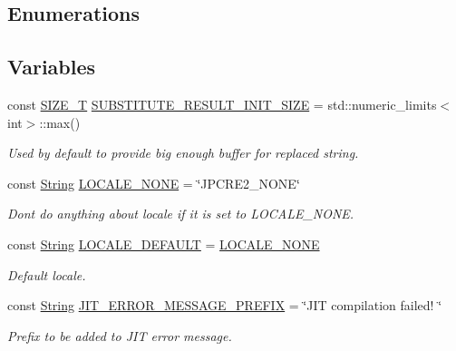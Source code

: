 \subsection*{Enumerations}
\subsection*{Variables}
\begin{DoxyCompactItemize}
\item 
const \hyperlink{namespacejpcre2_a2aac465ddcb123560c7c8215dd69246c}{S\+I\+Z\+E\+\_\+T} \hyperlink{namespacejpcre2_a80cb201f2e733137b22a8ed98465096a}{S\+U\+B\+S\+T\+I\+T\+U\+T\+E\+\_\+\+R\+E\+S\+U\+L\+T\+\_\+\+I\+N\+I\+T\+\_\+\+S\+I\+ZE} = std\+::numeric\+\_\+limits$<$int$>$\+::max()
\begin{DoxyCompactList}\small\item\em Used by default to provide big enough buffer for replaced string. \end{DoxyCompactList}\item 
const \hyperlink{namespacejpcre2_a91f03070152fb228bc116c5a737f1d16}{String} \hyperlink{namespacejpcre2_ad2236dcdcc14d580724b256ce7f168e5}{L\+O\+C\+A\+L\+E\+\_\+\+N\+O\+NE} = \char`\"{}J\+P\+C\+R\+E2\+\_\+\+N\+O\+NE\char`\"{}
\begin{DoxyCompactList}\small\item\em Don\textquotesingle{}t do anything about locale if it is set to L\+O\+C\+A\+L\+E\+\_\+\+N\+O\+NE. \end{DoxyCompactList}\item 
const \hyperlink{namespacejpcre2_a91f03070152fb228bc116c5a737f1d16}{String} \hyperlink{namespacejpcre2_adfdd3d1fff99e685734ae4e59771e84d}{L\+O\+C\+A\+L\+E\+\_\+\+D\+E\+F\+A\+U\+LT} = \hyperlink{namespacejpcre2_ad2236dcdcc14d580724b256ce7f168e5}{L\+O\+C\+A\+L\+E\+\_\+\+N\+O\+NE}
\begin{DoxyCompactList}\small\item\em Default locale. \end{DoxyCompactList}\item 
const \hyperlink{namespacejpcre2_a91f03070152fb228bc116c5a737f1d16}{String} \hyperlink{namespacejpcre2_abf6c3bff9268a572c299958d334ff26e}{J\+I\+T\+\_\+\+E\+R\+R\+O\+R\+\_\+\+M\+E\+S\+S\+A\+G\+E\+\_\+\+P\+R\+E\+F\+IX} = \char`\"{}J\+IT compilation failed! \char`\"{}\hypertarget{namespacejpcre2_abf6c3bff9268a572c299958d334ff26e}{}\label{namespacejpcre2_abf6c3bff9268a572c299958d334ff26e}

\begin{DoxyCompactList}\small\item\em Prefix to be added to J\+IT error message. \end{DoxyCompactList}\end{DoxyCompactItemize}


